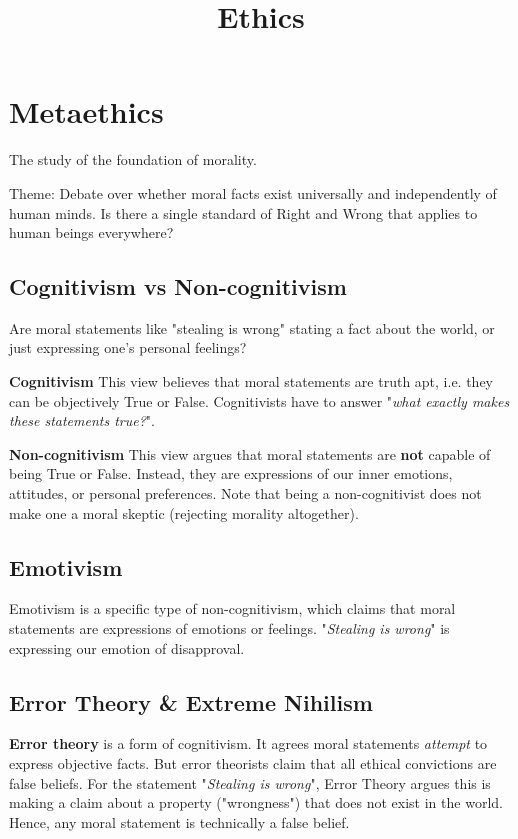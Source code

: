 \documentclass[12pt]{article}
\title{Ethics}
\date{}
\author{}
\begin{document}
\section{Metaethics}
The study of the foundation of morality.

\noindent Theme: Debate over whether moral facts exist universally and independently of human minds.
Is there a single standard of Right and Wrong that applies to human beings everywhere?

\subsection{Cognitivism vs Non-cognitivism}
Are moral statements like "stealing is wrong" stating a fact about the world,
or just expressing one's personal feelings?

\textbf{Cognitivism} This view believes that moral statements are truth apt,
i.e. they can be objectively True or False. Cognitivists have to answer "\textit{what exactly makes these statements true?}".

\textbf{Non-cognitivism} This view argues that moral statements are \textbf{not} capable of 
being True or False. Instead, they are expressions of our inner emotions, attitudes, or personal preferences.
Note that being a non-cognitivist does not make one a moral skeptic (rejecting morality altogether).

\subsection{Emotivism}
Emotivism is a specific type of non-cognitivism, which claims that moral statements are expressions of emotions or feelings.
"\textit{Stealing is wrong}" is expressing our emotion of disapproval.

\subsection{Error Theory \& Extreme Nihilism}

\textbf{Error theory} is a form of cognitivism. It agrees moral statements \textit{attempt} to express objective facts.
But error theorists claim that all ethical convictions are false beliefs.
For the statement "\textit{Stealing is wrong}", Error Theory argues this is making a claim about a property ("wrongness")
that does not exist in the world. Hence, any moral statement is technically a false belief.
\end{document}
